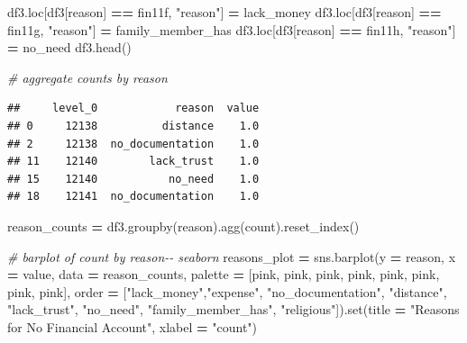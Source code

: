 \documentclass[water,article,submit,moreauthors,pdftex]{mdpi}
\newenvironment{Shaded}{\begin{snugshade}}{\end{snugshade}}
\newcommand{\BuiltInTok}[1]{#1}
\newcommand{\CommentTok}[1]{\textcolor[rgb]{0.56,0.35,0.01}{\textit{#1}}}
\newcommand{\NormalTok}[1]{#1}
\newcommand{\OperatorTok}[1]{\textcolor[rgb]{0.81,0.36,0.00}{\textbf{#1}}}
\newcommand{\StringTok}[1]{\textcolor[rgb]{0.31,0.60,0.02}{#1}}
\begin{document}
\begin{Shaded}
\begin{Highlighting}[]
\NormalTok{df3.loc[df3[}\StringTok{\textquotesingle{}reason\textquotesingle{}}\NormalTok{] }\OperatorTok{==} \StringTok{\textquotesingle{}fin11f\textquotesingle{}}\NormalTok{, }\StringTok{"reason"}\NormalTok{] }\OperatorTok{=} \StringTok{\textquotesingle{}lack\_money\textquotesingle{}}
\NormalTok{df3.loc[df3[}\StringTok{\textquotesingle{}reason\textquotesingle{}}\NormalTok{] }\OperatorTok{==} \StringTok{\textquotesingle{}fin11g\textquotesingle{}}\NormalTok{, }\StringTok{"reason"}\NormalTok{] }\OperatorTok{=} \StringTok{\textquotesingle{}family\_member\_has\textquotesingle{}}
\NormalTok{df3.loc[df3[}\StringTok{\textquotesingle{}reason\textquotesingle{}}\NormalTok{] }\OperatorTok{==} \StringTok{\textquotesingle{}fin11h\textquotesingle{}}\NormalTok{, }\StringTok{"reason"}\NormalTok{] }\OperatorTok{=} \StringTok{\textquotesingle{}no\_need\textquotesingle{}}
\NormalTok{df3.head()}

\CommentTok{\# aggregate counts by reason}
\end{Highlighting}
\end{Shaded}

\begin{verbatim}
##     level_0            reason  value
## 0     12138          distance    1.0
## 2     12138  no_documentation    1.0
## 11    12140        lack_trust    1.0
## 15    12140           no_need    1.0
## 18    12141  no_documentation    1.0
\end{verbatim}

\begin{Shaded}
\begin{Highlighting}[]
\NormalTok{reason\_counts }\OperatorTok{=}\NormalTok{ df3.groupby(}\StringTok{\textquotesingle{}reason\textquotesingle{}}\NormalTok{).agg(}\StringTok{\textquotesingle{}count\textquotesingle{}}\NormalTok{).reset\_index()}
\end{Highlighting}
\end{Shaded}

\begin{Shaded}
\begin{Highlighting}[]
\CommentTok{\# barplot of count by reason{-}{-} seaborn}
\NormalTok{reasons\_plot }\OperatorTok{=}\NormalTok{ sns.barplot(y }\OperatorTok{=} \StringTok{\textquotesingle{}reason\textquotesingle{}}\NormalTok{, x }\OperatorTok{=} \StringTok{\textquotesingle{}value\textquotesingle{}}\NormalTok{, data }\OperatorTok{=}\NormalTok{ reason\_counts, palette }\OperatorTok{=}\NormalTok{ [pink, pink, pink, pink, pink, pink, pink, pink], order }\OperatorTok{=}\NormalTok{ [}\StringTok{"lack\_money"}\NormalTok{,}\StringTok{"expense"}\NormalTok{,  }\StringTok{"no\_documentation"}\NormalTok{, }\StringTok{"distance"}\NormalTok{, }\StringTok{"lack\_trust"}\NormalTok{, }\StringTok{"no\_need"}\NormalTok{, }\StringTok{"family\_member\_has"}\NormalTok{, }\StringTok{"religious"}\NormalTok{]).}\BuiltInTok{set}\NormalTok{(title }\OperatorTok{=} \StringTok{"Reasons for No Financial Account"}\NormalTok{, xlabel }\OperatorTok{=} \StringTok{"count"}\NormalTok{)}
\end{Highlighting}
\end{Shaded}
\end{document}
